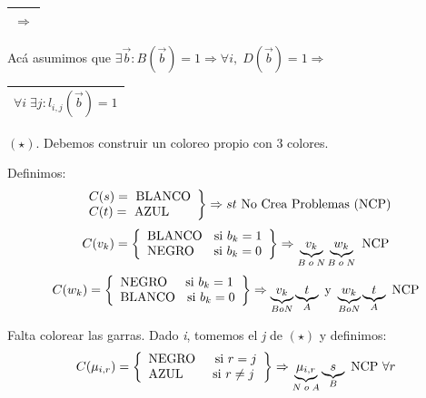 \documentclass[12pt,a4paper]{report}
\newcounter{neq}
\begin{document}
			\pagebreak
			\begin{tabular}{|c|} \hline $\Rightarrow$ \\\hline \end{tabular}
				\par Acá asumimos que $\exists \overrightarrow{b} : B(\overrightarrow{b}) = 1 \Rightarrow \forall i, \; D(\overrightarrow{b}) = 1 \Rightarrow$ \begin{tabular}{|c|} \hline $\forall i \; \exists j : l_{i, j}(\overrightarrow{b}) = 1$ \\ \hline \end{tabular} $(\star)$. Debemos construir un coloreo propio con 3 colores.
				\vspace{3mm}
				\par Definimos:
				\begin{equation*}
		  		\left.
		  		\begin{array}{l}
		    		C(s) = \textup{ BLANCO} \\
		    		C(t) = \textup{ AZUL}
		  		\end{array}
		 			\right\rbrace
		 			\Rightarrow s t \textup{ No Crea Problemas (NCP)}
				\end{equation*}
				\begin{equation*}
					C(v_{k}) =
					\left\lbrace
		  		\begin{array}{l}
		    		\textup{BLANCO \; si } b_{k} = 1 \\
		    		\textup{NEGRO \; \; si } b_{k} = 0
					\end{array}
		 			\right\rbrace
		 			\Rightarrow \underbrace{v_{k}}_{B \; o \; N} \underbrace{w_{k}}_{B \; o \; N} \textup{ NCP}
				\end{equation*}
				\begin{equation*}
					C(w_{k}) =
		  		\left\lbrace
					\begin{array}{l}
	  		 		\textup{NEGRO \; \, si } b_{k} = 1 \\
	  		 		\textup{BLANCO \; si } b_{k} = 0
					\end{array}
				 	\right\rbrace
				 	\Rightarrow \underbrace{v_{k}}_{B o N} \underbrace{t}_{A}  \textup { y } \underbrace{w_{k}}_{B o N} \underbrace{t}_{A} \textup{ NCP}
				\end{equation*}

				\par Falta colorear las garras. Dado \textit{i}, tomemos el \textit{j} de $(\star )$ y definimos:
				\begin{equation*}
					C(\mu_{i, r}) =
		  		\left\lbrace
					\begin{array}{l}
	  		 		\textup{NEGRO \; \; si } r = j \\
	  		 		\textup{AZUL \qquad si } r \neq j
					\end{array}
				 	\right\rbrace
				 	\Rightarrow \underbrace{\mu_{i, r}}_{N \; o \; A} \underbrace{s}_{B} \textup{ NCP } \forall r
				\end{equation*}
\end{document}
